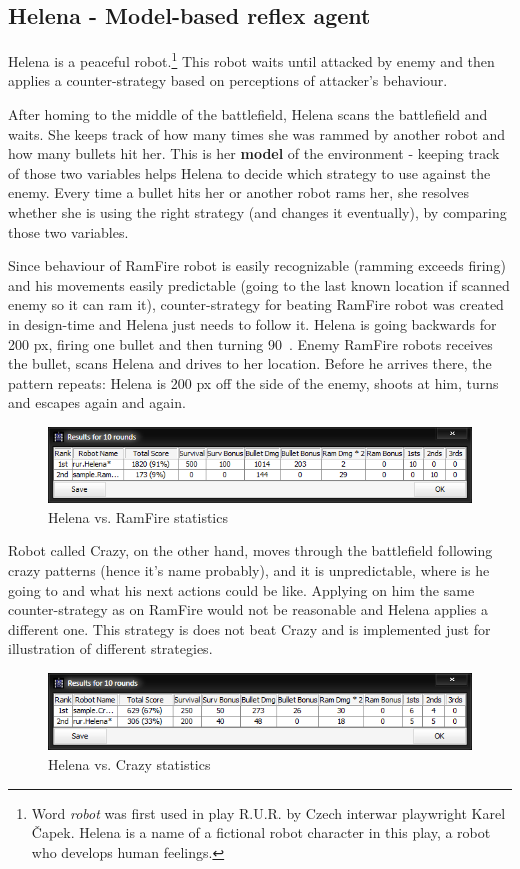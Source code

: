 \documentclass{article}
\begin{document}
\subsection{Helena - Model-based reflex agent}

Helena is a peaceful robot.\footnote{Word \textit{robot} was first used
in play R.U.R. by Czech interwar playwright Karel Čapek. Helena is a name of a
fictional robot character in this play, a robot who develops human feelings.}
This robot waits until attacked by enemy and then applies a counter-strategy
based on perceptions of attacker's behaviour.

After homing to the middle of the battlefield, Helena scans the battlefield and
waits. She keeps track of how many times she was rammed by another robot and how
many bullets hit her. This is her \textbf{model} of the environment - keeping
track of those two variables helps Helena to decide which strategy to use
against the enemy. Every time a bullet hits her or another robot rams her, she
resolves whether she is using the right strategy (and changes it eventually),
by comparing those two variables.

Since behaviour of RamFire robot is easily recognizable (ramming exceeds firing)
and his movements easily predictable (going to the last known location if
scanned enemy so it can ram it), counter-strategy for beating RamFire robot was
created in design-time and Helena just needs to follow it. Helena is going
backwards for 200 px, firing one bullet and then turning 90\degree~. Enemy
RamFire robots receives the bullet, scans Helena and drives to her location.
Before he arrives there, the pattern repeats: Helena is 200 px off the side of
the enemy, shoots at him, turns and escapes again and again.

\begin{figure}[h!]
  \caption{Helena vs. RamFire statistics}
  \centering
    \includegraphics[width=\textwidth]{helena-ramfire.png}
\end{figure}

Robot called Crazy, on the other hand, moves through the battlefield following
crazy patterns (hence it's name probably), and it is unpredictable, where is he
going to and what his next actions could be like. Applying on him the same
counter-strategy as on RamFire would not be reasonable and Helena applies a
different one. This strategy is does not beat Crazy and is implemented just for
illustration of different strategies.

\begin{figure}[h!]
  \caption{Helena vs. Crazy statistics}
  \centering
    \includegraphics[width=\textwidth]{helena-crazy.png}
\end{figure}
\end{document}
